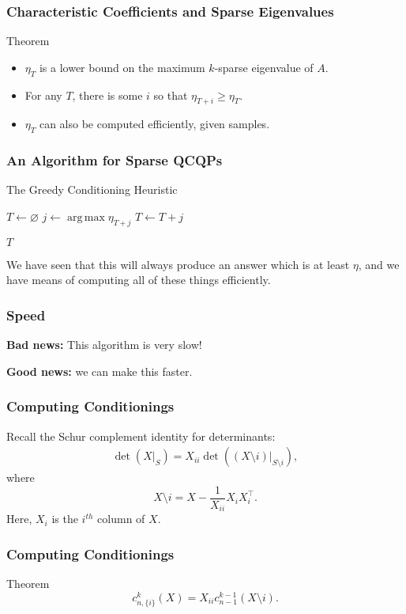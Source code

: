 \documentclass{beamer}
\DeclareMathOperator*{\argmax}{arg\,max}
\begin{document}
\begin{frame}
    \frametitle{Characteristic Coefficients and Sparse Eigenvalues}
    \begin{block}{Theorem}
        \begin{itemize}
            \item $\eta_T$ is a lower bound on the maximum $k$-sparse eigenvalue of $A$.
            \item For any $T$, there is some $i$ so that $\eta_{T + i} \ge \eta_T$.
            \item $\eta_T$ can also be computed efficiently, given samples.
        \end{itemize}
    \end{block}
\end{frame}
\begin{frame}
    \frametitle{An Algorithm for Sparse QCQPs}
    \begin{algorithm}[H]
    \caption{The Greedy Conditioning Heuristic}
    \label{alg:greedy}
    \begin{algorithmic}
        \State $T \gets \varnothing$
            \State $j \gets \argmax \eta_{T + j}$
            \State $T \gets T + j$
        \EndFor

        \Return $T$
    \end{algorithmic}
    \end{algorithm}

    We have seen that this will always produce an answer which is at least $\eta$, and we have means of computing all of these things efficiently.
\end{frame}
\begin{frame}
    \frametitle{Speed}
    \textbf{Bad news:} This algorithm is very slow!

    \textbf{Good news:} we can make this faster.
\end{frame}
\begin{frame}
    \frametitle{Computing Conditionings}
    Recall the Schur complement identity for determinants:
    \begin{align*}
        \det(X|_S) = X_{ii} \det((X \setminus i)|_{S \setminus i}),
    \end{align*}
    where 
    \[
        X \setminus i = X - \frac{1}{X_{ii}} X_i X_i^{\intercal}.
    \]
    Here, $X_i$ is the $i^{th}$ column of $X$.
\end{frame}
\begin{frame}
    \frametitle{Computing Conditionings}
    \begin{block}{Theorem}
        \[
            c_{n,\{i\}}^k(X) = X_{ii} c_{n-1}^{k-1}(X \setminus i).
        \]
    \end{block}
\end{frame}
\end{document}
